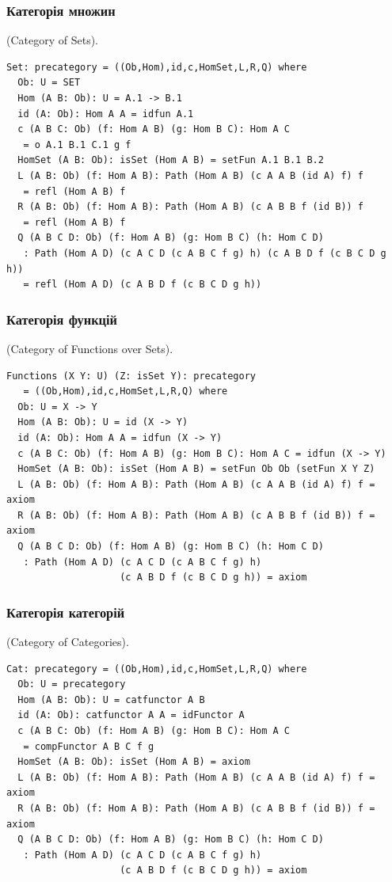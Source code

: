 \subsubsection{Категорія множин}
\begin{definition} (Category of Sets).
\begin{lstlisting}
Set: precategory = ((Ob,Hom),id,c,HomSet,L,R,Q) where
  Ob: U = SET
  Hom (A B: Ob): U = A.1 -> B.1
  id (A: Ob): Hom A A = idfun A.1
  c (A B C: Ob) (f: Hom A B) (g: Hom B C): Hom A C
   = o A.1 B.1 C.1 g f
  HomSet (A B: Ob): isSet (Hom A B) = setFun A.1 B.1 B.2
  L (A B: Ob) (f: Hom A B): Path (Hom A B) (c A A B (id A) f) f
   = refl (Hom A B) f
  R (A B: Ob) (f: Hom A B): Path (Hom A B) (c A B B f (id B)) f
   = refl (Hom A B) f
  Q (A B C D: Ob) (f: Hom A B) (g: Hom B C) (h: Hom C D)
   : Path (Hom A D) (c A C D (c A B C f g) h) (c A B D f (c B C D g h))
   = refl (Hom A D) (c A B D f (c B C D g h))
\end{lstlisting}
\end{definition}

\subsubsection{Категорія функцій}
\begin{definition} (Category of Functions over Sets).
\begin{lstlisting}
Functions (X Y: U) (Z: isSet Y): precategory
   = ((Ob,Hom),id,c,HomSet,L,R,Q) where
  Ob: U = X -> Y
  Hom (A B: Ob): U = id (X -> Y)
  id (A: Ob): Hom A A = idfun (X -> Y)
  c (A B C: Ob) (f: Hom A B) (g: Hom B C): Hom A C = idfun (X -> Y)
  HomSet (A B: Ob): isSet (Hom A B) = setFun Ob Ob (setFun X Y Z)
  L (A B: Ob) (f: Hom A B): Path (Hom A B) (c A A B (id A) f) f = axiom
  R (A B: Ob) (f: Hom A B): Path (Hom A B) (c A B B f (id B)) f = axiom
  Q (A B C D: Ob) (f: Hom A B) (g: Hom B C) (h: Hom C D)
   : Path (Hom A D) (c A C D (c A B C f g) h)
                    (c A B D f (c B C D g h)) = axiom
\end{lstlisting}
\end{definition}

\subsubsection{Категорія категорій}
\begin{definition} (Category of Categories).
\begin{lstlisting}
Cat: precategory = ((Ob,Hom),id,c,HomSet,L,R,Q) where
  Ob: U = precategory
  Hom (A B: Ob): U = catfunctor A B
  id (A: Ob): catfunctor A A = idFunctor A
  c (A B C: Ob) (f: Hom A B) (g: Hom B C): Hom A C
   = compFunctor A B C f g
  HomSet (A B: Ob): isSet (Hom A B) = axiom
  L (A B: Ob) (f: Hom A B): Path (Hom A B) (c A A B (id A) f) f = axiom
  R (A B: Ob) (f: Hom A B): Path (Hom A B) (c A B B f (id B)) f = axiom
  Q (A B C D: Ob) (f: Hom A B) (g: Hom B C) (h: Hom C D)
   : Path (Hom A D) (c A C D (c A B C f g) h)
                    (c A B D f (c B C D g h)) = axiom
\end{lstlisting}
\end{definition}


